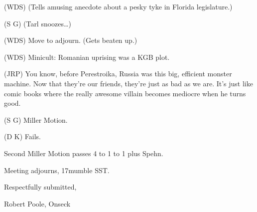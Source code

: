 (WDS) (Tells amusing anecdote about a pesky tyke in Florida legislature.)

(S G) (Tarl snoozes\ldots)

(WDS) Move to adjourn.
(Gets beaten up.)

(WDS) Minicult: Romanian uprising was a KGB plot.

(JRP) You know, before Perestroika, Russia was this big, efficient monster machine.  Now that they're our friends, they're just as bad as we are.  It's just like comic books where the really awesome villain becomes mediocre when he turns good.

(S G) Miller Motion.

(D K) Fails.

Second Miller Motion passes 4 to 1 to 1 plus Spehn.

Meeting adjourns, 17mumble SST.

\vspace{0.15in}
\begin{center}
Respectfully submitted,

Robert Poole, Onseck
\end{center}

